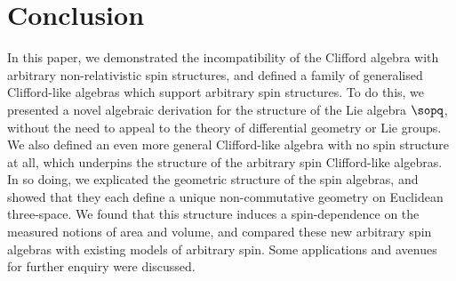\documentclass{article}
\begin{document}
\section{Conclusion}

In this paper, we demonstrated the incompatibility of the Clifford algebra with arbitrary non-relativistic spin structures, and defined a family of generalised Clifford-like algebras which support arbitrary spin structures. To do this, we presented a novel algebraic derivation for the structure of the Lie algebra $\sopq$, without the need to appeal to the theory of differential geometry or Lie groups. We also defined an even more general Clifford-like algebra with no spin structure at all, which underpins the structure of the arbitrary spin Clifford-like algebras. In so doing, we explicated the geometric structure of the spin algebras, and showed that they each define a unique non-commutative geometry on Euclidean three-space. We found that this structure induces a spin-dependence on the measured notions of area and volume, and compared these new arbitrary spin algebras with existing models of arbitrary spin. Some applications and avenues for further enquiry were discussed.
\end{document}
